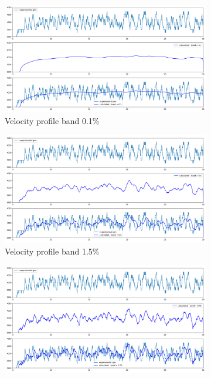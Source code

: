 \documentclass[10pt,fleqn,a4paper,twoside]{article}
\begin{document}
\begin{figure}
    \centering
    \begin{subfigure}{0.4\textwidth}
        \includegraphics[width=\textwidth]{Figures/rpm_analysis_mic0_band_0.1.png}
        \caption{Velocity profile band 0.1\%}
        \label{fig:first}
    \end{subfigure}
    \hfill
    \centering
    \begin{subfigure}{0.4\textwidth}
        \includegraphics[width=\textwidth]{Figures/rpm_analysis_mic0_band_0.5.png}
        \caption{Velocity profile band 1.5\%}
        \label{fig:second}
    \end{subfigure}
    \hfill
    \centering
    \begin{subfigure}{0.4\textwidth}
        \includegraphics[width=\textwidth]{Figures/rpm_analysis_mic0_band_0.75.png}

\end{subfigure}
\end{figure}
\end{document}
